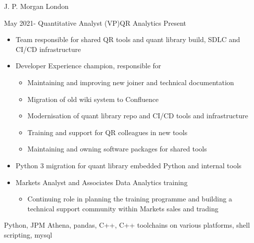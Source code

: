 %
%
%
\begin{experiences}
  \topofexperience
  	{J. P. Morgan} {London}
  	
  \experience
    {May 2021-}   {Quantitative Analyst (VP)}{QR Analytics}
    {Present} {
        \begin{itemize}
            \item Team responsible for shared QR tools and quant library build, SDLC and CI/CD  infrastructure
            \item Developer Experience champion, responsible for
            \begin{itemize}
                \item Maintaining and improving new joiner and technical documentation
                \item Migration of old wiki system to Confluence
                \item Modernisation of quant library repo and CI/CD tools and infrastructure
                \item Training and support for QR colleagues in new tools
                \item Maintaining and owning software packages for shared tools
            \end{itemize}
            
            \item Python 3 migration for quant library embedded Python and internal tools
            
            \item Markets Analyst and Associates Data Analytics training
            \begin{itemize}
                \item Continuing role in planning the training programme and building a technical support community within Markets sales and trading
            \end{itemize}

        \end{itemize}
       }
       {Python, JPM Athena, pandas, C++, C++ toolchains on various platforms, shell scripting, mysql}
  	

\end{experiences}
